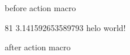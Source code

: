 
\FPmul{}%
\FPmul{}before action macro\mktsShowpar\par
81
3.141592653589793
helo world!\mktsShowpar\par
after action macro\mktsShowpar\par


